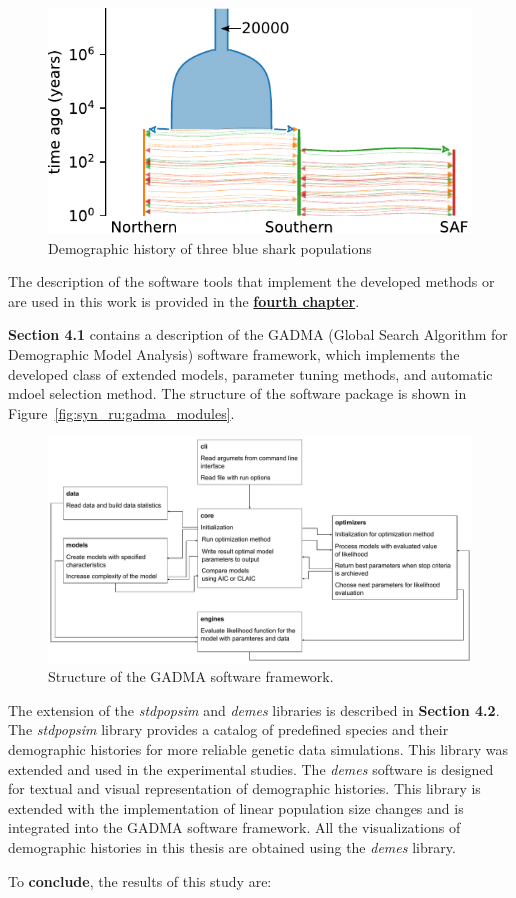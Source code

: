 \begin{figure}[b]
    \centering
        \includegraphics[width=0.6\linewidth]{images_experiments/blue_shark/3pop_history.pdf}
    \caption{Demographic history of three blue shark populations}
\end{figure}

The description of the software tools that implement the developed methods or are used in this work is provided in the \underline{\textbf{fourth chapter}}.

\textbf{Section 4.1} contains a description of the GADMA (Global Search Algorithm for Demographic Model Analysis) software framework, which implements the developed class of extended models, parameter tuning methods, and automatic mdoel selection method.
The structure of the software package is shown in Figure~\ref{fig:syn_ru:gadma_modules}.

\begin{figure}[ht]
\centering
\includegraphics[width=\linewidth]{images/part5/gadma_modules_en.pdf}
\caption{Structure of the GADMA software framework.}
\end{figure}

The extension of the \textit{stdpopsim} and \textit{demes} libraries is described in \textbf{Section 4.2}.
The \textit{stdpopsim} library provides a catalog of predefined species and their demographic histories for more reliable genetic data simulations.
This library was extended and used in the experimental studies.
The \textit{demes} software is designed for textual and visual representation of demographic histories.
This library is extended with the implementation of linear population size changes and is integrated into the GADMA software framework.
All the visualizations of demographic histories in this thesis are obtained using the \textit{demes} library.

To \textbf{conclude}, the results of this study are:

